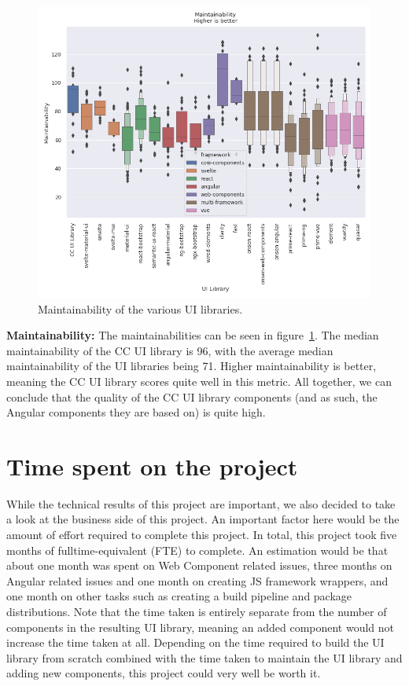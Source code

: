 \begin{figure}[h]
  \includegraphics[width=\columnwidth]{plots/maintainability.png}
  \caption{Maintainability of the various UI libraries.}
  \label{fig:results:maintainabilty}
  \centering
\end{figure}

\textbf{Maintainability:} The maintainabilities can be seen in figure~\ref{fig:results:maintainabilty}. The median maintainability of the CC UI library is 96, with the average median maintainability of the UI libraries being 71. Higher maintainability is better, meaning the CC UI library scores quite well in this metric. All together, we can conclude that the quality of the CC UI library components (and as such, the Angular components they are based on) is quite high.

\section{Time spent on the project}\label{sec:results:time-spent}
While the technical results of this project are important, we also decided to take a look at the business side of this project. An important factor here would be the amount of effort required to complete this project. In total, this project took five months of fulltime-equivalent (FTE) to complete. An estimation would be that about one month was spent on Web Component related issues, three months on Angular related issues and one month on creating JS framework wrappers, and one month on other tasks such as creating a build pipeline and package distributions. Note that the time taken is entirely separate from the number of components in the resulting UI library, meaning an added component would not increase the time taken at all. Depending on the time required to build the UI library from scratch combined with the time taken to maintain the UI library and adding new components, this project could very well be worth it.